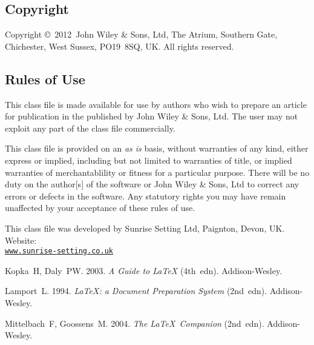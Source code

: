 \documentclass[times]{smrauth}
\def\volumeyear{2012}
\begin{document}
\subsection{Copyright}
Copyright \copyright\ \volumeyear\ John Wiley \& Sons, Ltd, The
Atrium, Southern Gate, Chichester, West Sussex, PO19~8SQ, UK. All
rights reserved.

\subsection{Rules of Use}
This class file is made available for use by authors who wish to
prepare an article for publication in the \emph{\journalnamelc}
published by John Wiley \& Sons, Ltd. The user may not exploit any
part of the class file commercially.

This class file is provided on an \emph{as is}  basis, without
warranties of any kind, either express or implied, including but
not limited to warranties of title, or implied  warranties of
merchantablility or fitness for a particular purpose. There will
be no duty on the author[s] of the software or  John Wiley \&
Sons, Ltd to correct any errors or defects in the software. Any
statutory  rights you may have remain unaffected by your
acceptance of these rules of use.

\ack This class file was developed by Sunrise Setting Ltd,
Paignton, Devon, UK. Website:\\
\href{http://www.sunrise-setting.co.uk}{\texttt{www.sunrise-setting.co.uk}}

\begin{thebibliography}{9}

 Kopka~H, Daly~PW. 2003. \emph{A Guide to \LaTeX} (4th~edn).
Addison-Wesley.

 Lamport~L. 1994. \emph{\LaTeX: a Document Preparation System} (2nd~edn).
Addison-Wesley.

 Mittelbach~F, Goossens~M. 2004. \emph{The \LaTeX\ Companion}
(2nd~edn). Addison-Wesley.
\end{thebibliography}
\end{document}
